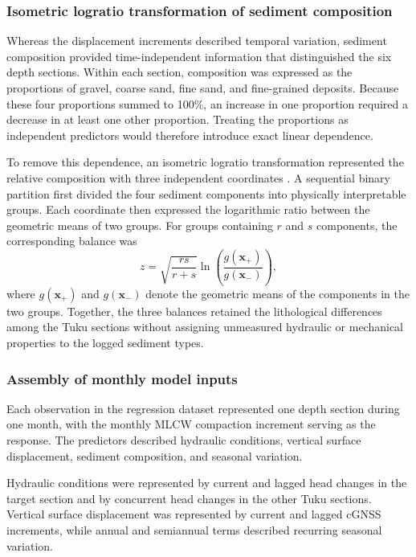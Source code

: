 \subsubsection{Isometric logratio transformation of sediment composition}
\label{subsec:ilr_transformation}

Whereas the displacement increments described temporal variation, sediment composition provided time-independent information that distinguished the six depth sections. Within each section, composition was expressed as the proportions of gravel, coarse sand, fine sand, and fine-grained deposits. Because these four proportions summed to 100\%, an increase in one proportion required a decrease in at least one other proportion. Treating the proportions as independent predictors would therefore introduce exact linear dependence.

To remove this dependence, an isometric logratio transformation represented the relative composition with three independent coordinates \citep{egozcue_isometric_2003, oh_using_2024}. A sequential binary partition first divided the four sediment components into physically interpretable groups. Each coordinate then expressed the logarithmic ratio between the geometric means of two groups. For groups containing $r$ and $s$ components, the corresponding balance was
\begin{equation}
z=\sqrt{\frac{rs}{r+s}}
\ln\left(\frac{g(\boldsymbol{x}_{+})}{g(\boldsymbol{x}_{-})}\right),
\label{eq:ilr_balance}
\end{equation}
where $g(\boldsymbol{x}_{+})$ and $g(\boldsymbol{x}_{-})$ denote the geometric means of the components in the two groups. Together, the three balances retained the lithological differences among the Tuku sections without assigning unmeasured hydraulic or mechanical properties to the logged sediment types.

\subsubsection{Assembly of monthly model inputs}

Each observation in the regression dataset represented one depth section during one month, with the monthly MLCW compaction increment serving as the response. The predictors described hydraulic conditions, vertical surface displacement, sediment composition, and seasonal variation.

Hydraulic conditions were represented by current and lagged head changes in the target section and by concurrent head changes in the other Tuku sections. Vertical surface displacement was represented by current and lagged cGNSS increments, while annual and semiannual terms described recurring seasonal variation.

